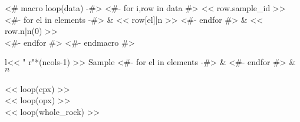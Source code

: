 <# macro loop(data) -#>
  <#- for i,row in data #>
    << row.sample_id >>
    <#- for el in elements -#>
    & << row[el]|n >>
    <#- endfor #> & << row.n|n(0) >> \\
  <#- endfor #>
<#- endmacro #>
\begin{tabular}{l<< " r"*(ncols-1) >>}
\toprule
  Sample
  <#- for el in elements -#>
  & 
  <#- endfor #> & $n$ \\
\midrule
   \\
\midrule
<< loop(cpx) >>
\midrule
   \\
\midrule
<< loop(opx) >>
\midrule
   \\
\midrule
<< loop(whole_rock) >>
\bottomrule
\end{tabular}


